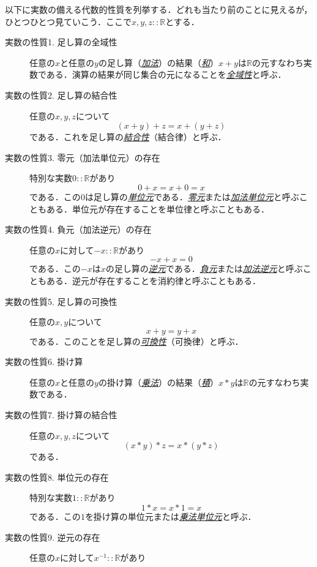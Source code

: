 \documentclass[a4paper]{jsbook}
\newcommand{\keyword}[1]{{\underline{\emph{#1}}}}
\newcommand{\mathSpecialSet}[1]{\mathbb{#1}} %
\newcommand{\mathIn}{\mathrel{::}}
\begin{document}
以下に実数の備える代数的性質を列挙する．どれも当たり前のことに見えるが，ひとつひとつ見ていこう．ここで$x,y,z\mathIn\mathSpecialSet{R}$とする．
\begin{description}
\item[実数の性質1. 足し算の全域性] 任意の$x$と任意の$y$の足し算（\keyword{加法}）の結果（\keyword{和}）$x+y$は$\mathSpecialSet{R}$の元すなわち実数である．演算の結果が同じ集合の元になることを\keyword{全域性}と呼ぶ．
\item[実数の性質2. 足し算の結合性] 任意の$x,y,z$について
\begin{equation}
(x+y)+z=x+(y+z)
\end{equation}
である．これを足し算の\keyword{結合性}（結合律）と呼ぶ．
\item[実数の性質3. 零元（加法単位元）の存在] 特別な実数$0\mathIn\mathSpecialSet{R}$があり
\begin{equation}
0+x=x+0=x
\end{equation}
である．この$0$は足し算の\keyword{単位元}である．\keyword{零元}または\keyword{加法単位元}と呼ぶこともある．単位元が存在することを単位律と呼ぶこともある．
\item[実数の性質4. 負元（加法逆元）の存在] 任意の$x$に対して$-x\mathIn\mathSpecialSet{R}$があり
\begin{equation}
-x+x=0
\end{equation}
である．この$-x$は$x$の足し算の\keyword{逆元}である．\keyword{負元}または\keyword{加法逆元}と呼ぶこともある．逆元が存在することを消約律と呼ぶこともある．
\item[実数の性質5. 足し算の可換性] 任意の$x,y$について
\begin{equation}
x+y=y+x
\end{equation}
である．このことを足し算の\keyword{可換性}（可換律）と呼ぶ．
\item[実数の性質6. 掛け算] 任意の$x$と任意の$y$の掛け算（\keyword{乗法}）の結果（\keyword{積}）$x*y$は$\mathSpecialSet{R}$の元すなわち実数である．
\item[実数の性質7. 掛け算の結合性] 任意の$x,y,z$について
\begin{equation}
(x*y)*z=x*(y*z)
\end{equation}
である．
\item[実数の性質8. 単位元の存在] 特別な実数$1\mathIn\mathSpecialSet{R}$があり
\begin{equation}
1*x=x*1=x
\end{equation}
である．この$1$を掛け算の単位元または\keyword{乗法単位元}と呼ぶ．
\item[実数の性質9. 逆元の存在] 任意の$x$に対して$x^{-1}\mathIn\mathSpecialSet{R}$があり

\end{description}
\end{document}

